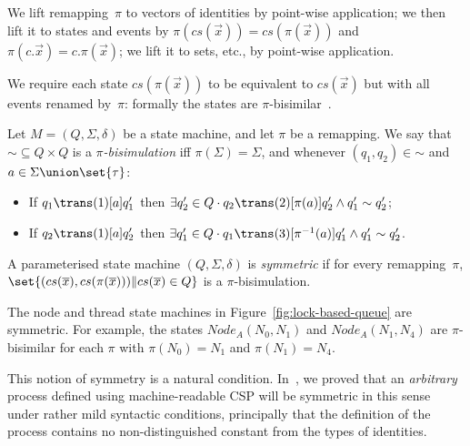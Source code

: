 We lift remapping~$\pi$ to vectors of identities by point-wise application; we
then lift it to states and events by $\pi(cs(\vec{x})) = cs(\pi(\vec{x}))$ and
$\pi(c.\vec{x}) = c.\pi(\vec{x})$; we lift it to sets, etc., by point-wise
application.

We require each state $cs(\pi(\vec{x}))$ to be equivalent to $cs(\vec{x})$ but
with all events renamed by~$\pi$: formally the states are
$\pi$-bisimilar~\cite{moffat-symmetry}.
%
\begin{definition}
\label{def:pi-bisimilar}
Let $M = (Q, \Sigma, \delta)$ be a state machine, and let $\pi$ be a
remapping.  We say that $\mathord{\sim} \subseteq Q \times Q$ is
a \emph{$\pi$-bisimulation} iff $\pi(\Sigma) = \Sigma$, and whenever $(q_1,
q_2) \in \mathord{\sim}$ and $a \in \Sigma \union \set{\tau}$:
%
\begin{itemize}
\item If $q_1\trans(1)[a] q_1'$ then
$\exists q_2' \in Q \cdot q_2 \trans(2)[\pi(a)] q_2' \land q_1' \sim q_2'$;

\item If $q_2 \trans(1)[a] q_2'$ then
$\exists q_1' \in Q \cdot q_1 \trans(3)[\pi^{-1}(a)] q_1' \land q_1' \sim q_2'$.
\end{itemize}
\end{definition}

\begin{definition}
\label{def:symmetric-state-machine}
A parameterised state machine $(Q, \Sigma, \delta)$ is \emph{symmetric} if for
every remapping~$\pi$,\, 
$\set{ (cs(\vec{x}), cs(\pi(\vec{x}))) \| cs(\vec{x}) \in Q}$ is a
$\pi$-bisimulation.
\end{definition}

The node and thread state machines in Figure~\ref{fig:lock-based-queue} are
symmetric.  For example, the states $Node_A(N_0, N_1)$ and $Node_A(N_1,N_4)$
are $\pi$-bisimilar for each $\pi$ with $\pi(N_0) = N_1$ and $\pi(N_1) = N_4$.

This notion of symmetry is a natural condition.  In~\cite{gavin-tom-symmetry},
we proved that an \emph{arbitrary} process defined using machine-readable CSP
will be symmetric in this sense under rather mild syntactic conditions,
principally  that the definition of the process contains no
non-distinguished constant from the types of identities.

